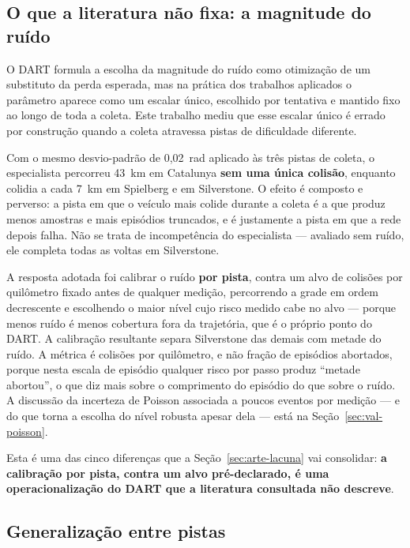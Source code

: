 \subsection{O que a literatura não fixa: a magnitude do ruído}

O DART \cite{Laskey2017DART} formula a escolha da magnitude do ruído como
otimização de um substituto da perda esperada, mas na prática dos trabalhos
aplicados o parâmetro aparece como um escalar único, escolhido por tentativa e
mantido fixo ao longo de toda a coleta. Este trabalho mediu que esse escalar
único é errado por construção quando a coleta atravessa pistas de dificuldade
diferente.

Com o mesmo desvio-padrão de 0,02~rad aplicado às três pistas de coleta, o
especialista percorreu 43~km em Catalunya \textbf{sem uma única colisão},
enquanto colidia a cada 7~km em Spielberg e em Silverstone. O efeito é composto e
perverso: a pista em que o veículo mais colide durante a coleta é a que produz
menos amostras e mais episódios truncados, e é justamente a pista em que a rede
depois falha. Não se trata de incompetência do especialista --- avaliado sem
ruído, ele completa todas as voltas em Silverstone.

A resposta adotada foi calibrar o ruído \textbf{por pista}, contra um alvo de
colisões por quilômetro fixado antes de qualquer medição, percorrendo a grade em
ordem decrescente e escolhendo o maior nível cujo risco medido cabe no alvo ---
porque menos ruído é menos cobertura fora da trajetória, que é o próprio ponto do
DART. A calibração resultante separa Silverstone das demais com metade do ruído.
A métrica é colisões por quilômetro, e não fração de episódios abortados, porque
nesta escala de episódio qualquer risco por passo produz ``metade abortou'', o
que diz mais sobre o comprimento do episódio do que sobre o ruído. A
discussão da incerteza de Poisson associada a poucos eventos por medição --- e do
que torna a escolha do nível robusta apesar dela --- está na
Seção~\ref{sec:val-poisson}.

Esta é uma das cinco diferenças que a Seção~\ref{sec:arte-lacuna} vai
consolidar: \textbf{a calibração por pista, contra um alvo pré-declarado, é uma
operacionalização do DART que a literatura consultada não descreve}.

\subsection{Generalização entre pistas}

